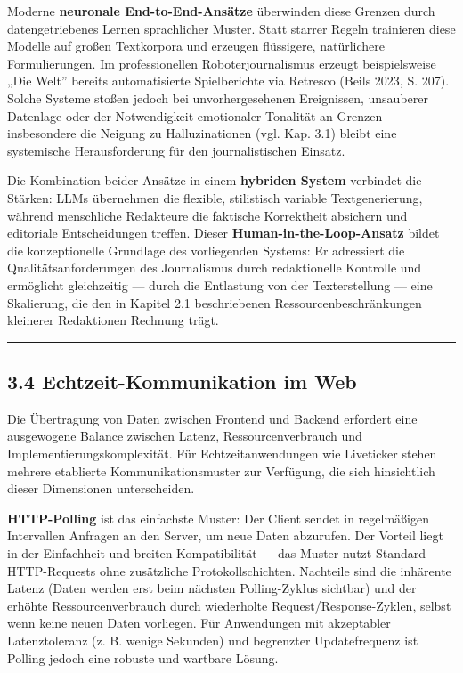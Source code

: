 Moderne \textbf{neuronale End-to-End-Ansätze} überwinden diese Grenzen
durch datengetriebenes Lernen sprachlicher Muster. Statt starrer Regeln
trainieren diese Modelle auf großen Textkorpora und erzeugen flüssigere,
natürlichere Formulierungen. Im professionellen Roboterjournalismus
erzeugt beispielsweise „Die Welt'' bereits automatisierte Spielberichte
via Retresco (Beils 2023, S. 207). Solche Systeme stoßen jedoch bei
unvorhergesehenen Ereignissen, unsauberer Datenlage oder der
Notwendigkeit emotionaler Tonalität an Grenzen --- insbesondere die
Neigung zu Halluzinationen (vgl. Kap. 3.1) bleibt eine systemische
Herausforderung für den journalistischen Einsatz.

Die Kombination beider Ansätze in einem \textbf{hybriden System}
verbindet die Stärken: LLMs übernehmen die flexible, stilistisch
variable Textgenerierung, während menschliche Redakteure die faktische
Korrektheit absichern und editoriale Entscheidungen treffen. Dieser
\textbf{Human-in-the-Loop-Ansatz} bildet die konzeptionelle Grundlage
des vorliegenden Systems: Er adressiert die Qualitätsanforderungen des
Journalismus durch redaktionelle Kontrolle und ermöglicht gleichzeitig
--- durch die Entlastung von der Texterstellung --- eine Skalierung, die
den in Kapitel 2.1 beschriebenen Ressourcenbeschränkungen kleinerer
Redaktionen Rechnung trägt.

\begin{center}\rule{0.5\linewidth}{0.5pt}\end{center}

\subsection{3.4 Echtzeit-Kommunikation im
Web}\label{echtzeit-kommunikation-im-web}

Die Übertragung von Daten zwischen Frontend und Backend erfordert eine
ausgewogene Balance zwischen Latenz, Ressourcenverbrauch und
Implementierungskomplexität. Für Echtzeitanwendungen wie Liveticker
stehen mehrere etablierte Kommunikationsmuster zur Verfügung, die sich
hinsichtlich dieser Dimensionen unterscheiden.

\textbf{HTTP-Polling} ist das einfachste Muster: Der Client sendet in
regelmäßigen Intervallen Anfragen an den Server, um neue Daten
abzurufen. Der Vorteil liegt in der Einfachheit und breiten
Kompatibilität --- das Muster nutzt Standard-HTTP-Requests ohne
zusätzliche Protokollschichten. Nachteile sind die inhärente Latenz
(Daten werden erst beim nächsten Polling-Zyklus sichtbar) und der
erhöhte Ressourcenverbrauch durch wiederholte Request/Response-Zyklen,
selbst wenn keine neuen Daten vorliegen. Für Anwendungen mit akzeptabler
Latenztoleranz (z. B. wenige Sekunden) und begrenzter Updatefrequenz ist
Polling jedoch eine robuste und wartbare Lösung.

